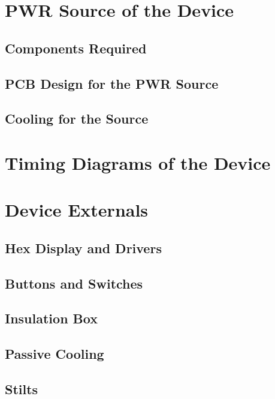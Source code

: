 \documentclass{article}
\begin{document}
\section{\textbf{PWR Source of the Device}}
\subsection{Components Required}
\subsection{PCB Design for the PWR Source}
\subsection{Cooling for the Source}
\section{\textbf{Timing Diagrams of the Device}}
\section{\textbf{Device Externals}}
\subsection{Hex Display and Drivers}
\subsection{Buttons and Switches}
\subsection{Insulation Box}
\subsection{Passive Cooling}
\subsection{Stilts}
\end{document}
